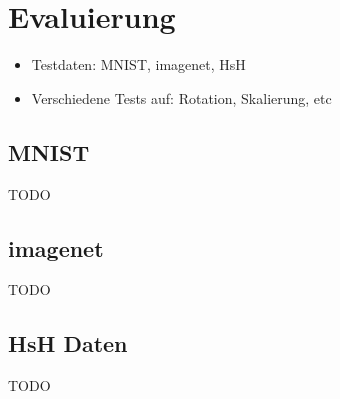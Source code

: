 \chapter{Evaluierung}

\begin{itemize}
	\item Testdaten: MNIST, imagenet, HsH
	\item Verschiedene Tests auf: Rotation, Skalierung, etc
\end{itemize}

\section{MNIST}
TODO

\section{imagenet}
TODO

\section{HsH Daten}
TODO